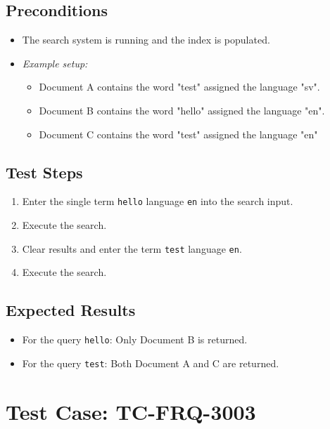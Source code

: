 \documentclass{article}
\begin{document}
\subsection*{Preconditions}
\begin{itemize}
  \item The search system is running and the index is populated.
  \item[] \textit{Example setup:}
  \begin{itemize}
      \item Document A contains the word "test" assigned the language "sv".
      \item Document B contains the word "hello" assigned the language "en".
      \item Document C contains the word "test" assigned the language "en" 
  \end{itemize}
\end{itemize}

\subsection*{Test Steps}
\begin{enumerate}
        \item Enter the single term \texttt{hello} language \texttt{en} into the search input.
        \item Execute the search.
        \item Clear results and enter the term \texttt{test} language \texttt{en}.
        \item Execute the search.
    \end{enumerate}


\subsection*{Expected Results}
\begin{itemize}
        \item For the query \texttt{hello}: Only Document B is returned.
        \item For the query \texttt{test}: Both Document A and C are returned.
\end{itemize}

\section{Test Case: TC-FRQ-3003}
\end{document}
